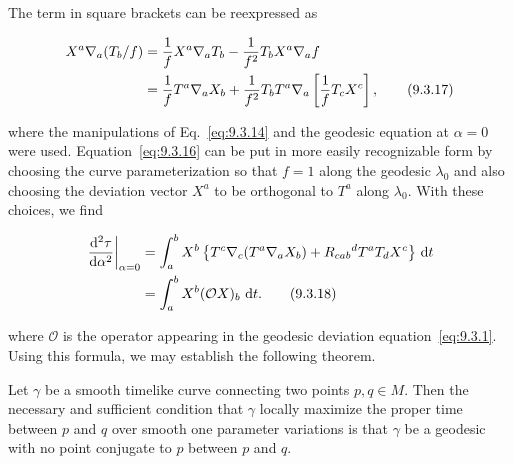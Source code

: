 The term in square brackets can be reexpressed as

\begin{align}
  X^a\nabla_a(T_b/f)
    &=\frac1fX^a\nabla_aT_b-\frac1{f^2}T_bX^a\nabla_af\notag\\
    &=\frac1fT^a\nabla_aX_b
      +\frac1{f^2}T_bT^a\nabla_a\left[\frac1fT_cX^c\right] ,
  \tag{9.3.17}\label{eq:9.3.17}
\end{align}

where the manipulations of Eq.~\eqref{eq:9.3.14} and the geodesic equation at
\(\alpha=0\) were used. Equation~\eqref{eq:9.3.16} can be put in more easily
recognizable form by choosing the curve parameterization so that \(f=1\) along the
geodesic \(\lambda_0\) and also choosing the deviation vector \(X^a\) to be orthogonal
to \(T^a\) along \(\lambda_0\). With these choices, we find

\begin{align}
  \left.\frac{\mathop{}\!\mathrm{d}^2\tau}{\mathop{}\!\mathrm{d}\alpha^2}\right|_{\alpha=0}
    &=\int_a^bX^b\left\{T^c\nabla_c(T^a\nabla_aX_b)
      +R_{cab}{}^dT^aT_dX^c\right\}\,\mathop{}\!\mathrm{d} t\notag\\
    &=\int_a^bX^b(\mathcal OX)_b\,\mathop{}\!\mathrm{d} t .
  \tag{9.3.18}\label{eq:9.3.18}
\end{align}

where \(\mathcal O\) is the operator appearing in the geodesic deviation
equation~\eqref{eq:9.3.1}. Using this formula, we may establish the following theorem.

\begin{theorem}\label{thm:9.3.3}
Let \(\gamma\) be a smooth timelike curve connecting two points \(p,q\in M\).
Then the necessary and sufficient condition that \(\gamma\) locally maximize the
proper time between \(p\) and \(q\) over smooth one parameter variations is that
\(\gamma\) be a geodesic with no point conjugate to \(p\) between \(p\) and \(q\).
\end{theorem}

